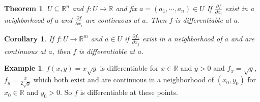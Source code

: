 \documentclass[11pt,a4paper]{article}
\theoremstyle{definition}
\newtheorem{example}[definition]{Example}
\theoremstyle{plain}
\newtheorem{theorem}[definition]{Theorem}
\newtheorem{corollary}[definition]{Corollary}
\theoremstyle{remark}
\newcommand{\R}{\mathbb{R}}
\begin{document}
\begin{theorem}
    $U \subseteq \R^n$ and $f \colon U \to \R$ and fix $a = (a_1, \cdots, a_n) \in U$ If 
    $\frac{\partial f}{\partial x_i}$ exist in a neighborhood of $a$ and 
    $\frac{\partial f}{\partial x_i}$ are continuous at $a$. Then $f$ is differentiable at $a$.
\end{theorem}

\begin{corollary}
    If $f \colon U \to \R^m$ and $a \in U$ if 
    $\frac{\partial f_i}{\partial x_j}$ exist in a neighborhood of $a$ and are continuous at $a$, then $f$ is differentiable at $a$.
\end{corollary}

\begin{example}
    $f(x,y) = x \sqrt{y}$ is differentiable for $x \in \R$ and $y > 0$ and 
    $f_x = \sqrt{y}$, $f_y = \frac{x}{2\sqrt{y}}$ which both exist and are continuous in a neighborhood of $(x_0, y_0)$ for $x_0\in \R$ and $y_0 > 0$. 
    So $f$ is differentiable at these points. 
\end{example}
\end{document}
